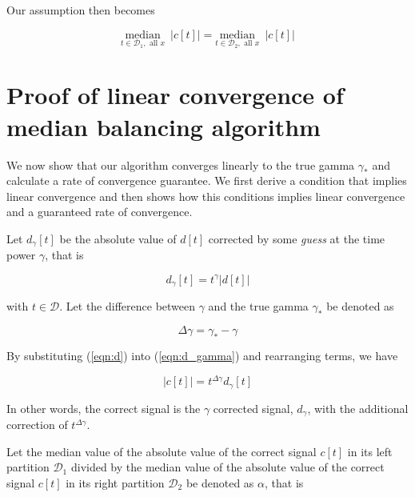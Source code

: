 \documentclass{segabs}
\newcommand{\truegamma}{\gamma_*}
\newcommand{\deltagamma}{{\Delta\gamma}}
\newcommand{\Done}{{\mathcal{D}_1}}
\newcommand{\Dtwo}{{\mathcal{D}_2}}
\newcommand{\undermedian}[2]{\underset{#1}{\text{median}}\,\,\,#2}
\begin{document}
Our assumption then becomes

\begin{equation}
 \undermedian{t\in \Done, \,\, \mbox{all $x$}}{ |c[t]| }  = \undermedian{t\in \Dtwo, \,\, \mbox{all $x$}}{|c[t]|}  
\end{equation}

\section*{Proof of linear convergence of median balancing algorithm}

We now show that our algorithm converges linearly to the true gamma $\truegamma$ and calculate a rate of convergence guarantee. We first derive a condition that implies linear convergence and then shows how this conditions implies linear convergence and a guaranteed rate of convergence.


Let $d_{\gamma}[t]$ be the absolute value of $d[t]$ corrected by some \emph{guess} at the time power $\gamma$, that is

\begin{equation}
\label{eqn:d_gamma}
d_\gamma[t] = t^\gamma \left| d[t] \right|
\end{equation}

with $t \in \mathcal{D}$.  Let the difference between $\gamma$ and the true gamma $\truegamma$ be denoted as 

\begin{equation}
\label{eq:deltagamma_def}
\deltagamma = \truegamma - \gamma
\end{equation}

By substituting (\ref{eqn:d}) into (\ref{eqn:d_gamma}) and rearranging terms, we have

\begin{equation}
|c[t]|=t^{\deltagamma} d_\gamma[t]
\end{equation}  

In other words, the correct signal is the $\gamma$ corrected signal, $d_\gamma$, with the additional correction of $t^{\deltagamma}$.  

Let the median value of the absolute value of the correct signal $c[t]$ in its left partition $\Done$ divided by the median value of the absolute value of the correct signal $c[t]$ in its right partition $\Dtwo$ be denoted as $\alpha$, that is  
\end{document}
